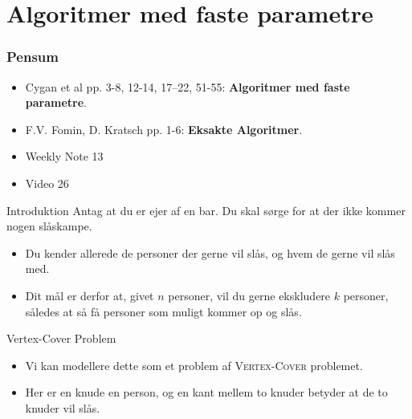 \section{Algoritmer med faste parametre}%
\label{sec:algoparametre}

\begin{frame}
  \frametitle{Pensum}
  \begin{itemize}
    \item Cygan et al pp. 3-8, 12-14, 17--22, 51-55: \textbf{Algoritmer med faste parametre}.
    \item F.V. Fomin, D. Kratsch pp. 1-6: \textbf{Eksakte Algoritmer}.
    \item Weekly Note 13
    \item Video 26
  \end{itemize}
\end{frame}

\begin{frame}{Introduktion}
    Antag at du er ejer af en bar. Du skal sørge for at der ikke kommer nogen slåskampe.
    \begin{itemize}
        \item Du kender allerede de personer der gerne vil slås, og hvem de gerne vil slås med.
        \item Dit mål er derfor at, givet $n$ personer, vil du gerne ekskludere $k$ personer, således at så få personer som muligt kommer op og slås.
    \end{itemize}
\end{frame}

\begin{frame}{Vertex-Cover Problem}
    \begin{itemize}
        \item Vi kan modellere dette som et problem af \textsc{Vertex-Cover} problemet.
        \item Her er en knude en person, og en kant mellem to knuder betyder at de to knuder vil slås.
    \end{itemize}
\end{frame}

